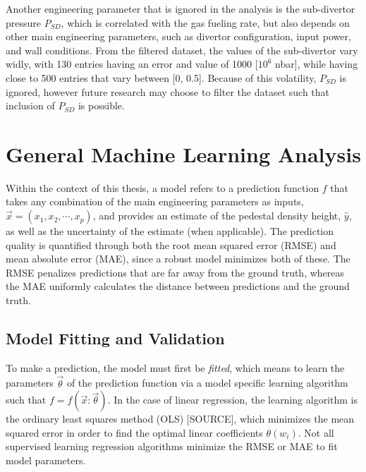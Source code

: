 \documentclass[a4paper, twoside, final, 12pt]{article}
\begin{document}
Another engineering parameter that is ignored in the analysis is the sub-divertor pressure $P_{SD}$, which is correlated with the gas fueling rate, but also depends on other main engineering parameters, such as divertor configuration, input power, and wall conditions.
From the filtered dataset, the values of the sub-divertor vary widly, with 130 entries having an error and value of 1000 [$10^6$ nbar], while having close to 500 entries that vary between [0, 0.5].
Because of this volatility, $P_{SD}$ is ignored, however future research may choose to filter the dataset such that inclusion of $P_{SD}$ is possible.



\section{General Machine Learning Analysis}\label{sec:principle-machine-learning-analysis}
Within the context of this thesis, a model refers to a prediction function $f$ that takes any combination of the main engineering parameters as inputs, $\vec{x} = (x_1, x_2, \cdots, x_p)$,  and provides an estimate of the pedestal density height, $\hat{y}$, as well as the uncertainty of the estimate (when applicable).
The prediction quality is quantified through both the root mean squared error (RMSE) and mean absolute error (MAE), since a robust model minimizes both of these.
The RMSE penalizes predictions that are far away from the ground truth, whereas the MAE uniformly calculates the distance between predictions and the ground truth.

\subsection{Model Fitting and Validation}
To make a prediction, the model must first be \textit{fitted}, which means to learn the parameters $\vec{\theta}$ of the prediction function via a model specific learning algorithm such that $f = f(\vec{x}: \vec{\theta})$.
In the case of linear regression, the learning algorithm is the ordinary least squares method (OLS) [SOURCE], which minimizes the mean squared error in order to find the optimal linear coefficients $\theta(w_i)$.
Not all supervised learning regression algorithms minimize the RMSE or MAE to fit model parameters. 
\end{document}
